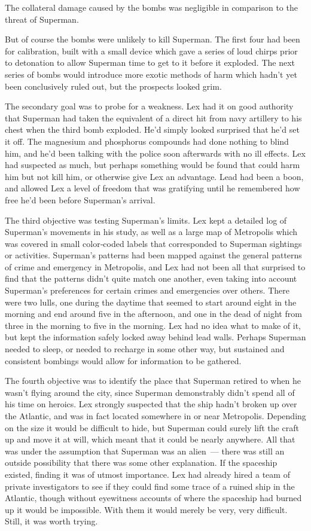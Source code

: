 The collateral damage caused by the bombs was negligible in comparison
to the threat of Superman.

But of course the bombs were unlikely to kill Superman. The first four
had been for calibration, built with a small device which gave a series
of loud chirps prior to detonation to allow Superman time to get to it
before it exploded. The next series of bombs would introduce more exotic
methods of harm which hadn't yet been conclusively ruled out, but the
prospects looked grim.

The secondary goal was to probe for a weakness. Lex had it on good
authority that Superman had taken the equivalent of a direct hit from
navy artillery to his chest when the third bomb exploded. He'd simply
looked surprised that he'd set it off. The magnesium and phosphorus
compounds had done nothing to blind him, and he'd been talking with the
police soon afterwards with no ill effects. Lex had suspected as much,
but perhaps something would be found that could harm him but not kill
him, or otherwise give Lex an advantage. Lead had been a boon, and
allowed Lex a level of freedom that was gratifying until he remembered
how free he'd been before Superman's arrival.

The third objective was testing Superman's limits. Lex kept a detailed
log of Superman's movements in his study, as well as a large map of
Metropolis which was covered in small color‐coded labels that
corresponded to Superman sightings or activities. Superman's patterns
had been mapped against the general patterns of crime and emergency in
Metropolis, and Lex had not been all that surprised to find that the
patterns didn't quite match one another, even taking into account
Superman's preferences for certain crimes and emergencies over others.
There were two lulls, one during the daytime that seemed to start around
eight in the morning and end around five in the afternoon, and one in
the dead of night from three in the morning to five in the morning. Lex
had no idea what to make of it, but kept the information safely locked
away behind lead walls. Perhaps Superman needed to sleep, or needed to
recharge in some other way, but sustained and consistent bombings would
allow for information to be gathered.

The fourth objective was to identify the place that Superman retired to
when he wasn't flying around the city, since Superman demonstrably
didn't spend all of his time on heroics. Lex strongly suspected that the
ship hadn't broken up over the Atlantic, and was in fact located
somewhere in or near Metropolis. Depending on the size it would be
difficult to hide, but Superman could surely lift the craft up and move
it at will, which meant that it could be nearly anywhere. All that was
under the assumption that Superman was an alien~--- there was still an
outside possibility that there was some other explanation. If the
spaceship existed, finding it was of utmost importance. Lex had already
hired a team of private investigators to see if they could find some
trace of a ruined ship in the Atlantic, though without eyewitness
accounts of where the spaceship had burned up it would be impossible.
With them it would merely be very, very difficult. Still, it was worth
trying.


